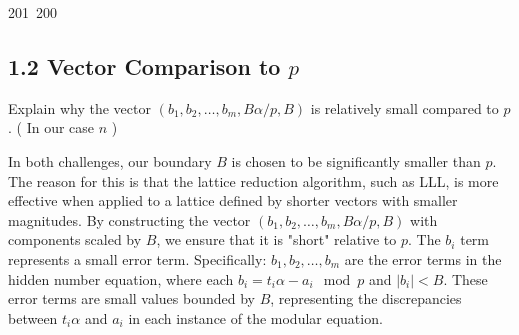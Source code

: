 201~200~\documentclass{article}
\begin{document}
	                                                                        	                                                                    	                                	                    	                    	                        	                        	                    	                                                                	                	                                                                    	                    \subsection{1.2 Vector Comparison to \( p \)}
	                                                                        	                                                                    	                                	                    	                    	                        	                        	                    	                                                                	                	                                                                    	                    Explain why the vector \( (b_1, b_2, \ldots, b_m, B\alpha/p, B) \) is relatively small compared to \( p \). ( In our case $n$ )

	                                                                        	                                                                    	                                	                    	                    	                        	                        	                    	                                                                	                	                                                                    	                    In both challenges, our boundary \( B \) is chosen to be significantly smaller than \( p \). The reason for this is that the lattice reduction algorithm, such as LLL, is more effective when applied to a lattice defined by shorter vectors with smaller magnitudes. By constructing the vector \( (b_1, b_2, \ldots, b_m, B\alpha/p, B) \) with components scaled by \( B \), we ensure that it is "short" relative to \( p \). The \( b_i \) term represents a small error term. Specifically: \( b_1, b_2, \dots, b_m \) are the error terms in the hidden number equation, where each \( b_i = t_i \alpha - a_i \mod p \) and \( |b_i| < B \). These error terms are small values bounded by \( B \), representing the discrepancies between \( t_i \alpha \) and \( a_i \) in each instance of the modular equation.
\end{document}
